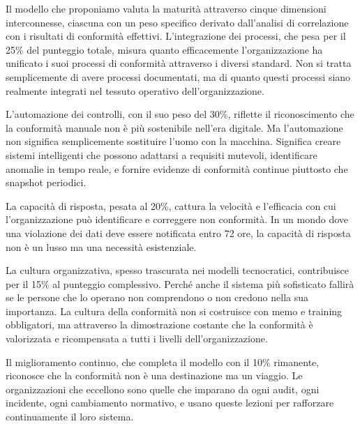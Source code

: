 Il modello che proponiamo valuta la maturità attraverso cinque dimensioni interconnesse, ciascuna con un peso specifico derivato dall'analisi di correlazione con i risultati di conformità effettivi. L'integrazione dei processi, che pesa per il 25\% del punteggio totale, misura quanto efficacemente l'organizzazione ha unificato i suoi processi di conformità attraverso i diversi standard. Non si tratta semplicemente di avere processi documentati, ma di quanto questi processi siano realmente integrati nel tessuto operativo dell'organizzazione.

L'automazione dei controlli, con il suo peso del 30\%, riflette il riconoscimento che la conformità manuale non è più sostenibile nell'era digitale. Ma l'automazione non significa semplicemente sostituire l'uomo con la macchina. Significa creare sistemi intelligenti che possono adattarsi a requisiti mutevoli, identificare anomalie in tempo reale, e fornire evidenze di conformità continue piuttosto che snapshot periodici.

La capacità di risposta, pesata al 20\%, cattura la velocità e l'efficacia con cui l'organizzazione può identificare e correggere non conformità. In un mondo dove una violazione dei dati deve essere notificata entro 72 ore, la capacità di risposta non è un lusso ma una necessità esistenziale.

La cultura organizzativa, spesso trascurata nei modelli tecnocratici, contribuisce per il 15\% al punteggio complessivo. Perché anche il sistema più sofisticato fallirà se le persone che lo operano non comprendono o non credono nella sua importanza. La cultura della conformità non si costruisce con memo e training obbligatori, ma attraverso la dimostrazione costante che la conformità è valorizzata e ricompensata a tutti i livelli dell'organizzazione.

Il miglioramento continuo, che completa il modello con il 10\% rimanente, riconosce che la conformità non è una destinazione ma un viaggio. Le organizzazioni che eccellono sono quelle che imparano da ogni audit, ogni incidente, ogni cambiamento normativo, e usano queste lezioni per rafforzare continuamente il loro sistema.

